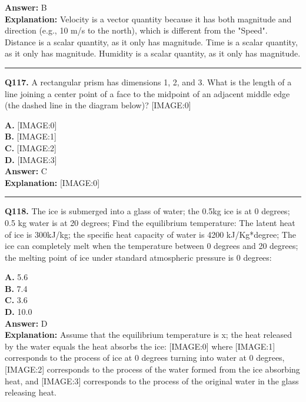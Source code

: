 \documentclass[12pt]{article}
\begin{document}
\textbf{Answer:} B \\
\textbf{Explanation:} Velocity is a vector quantity because it has both magnitude and direction (e.g., 10 m/s to the north), which is different from the "Speed".
Distance is a scalar quantity, as it only has magnitude.
Time is a scalar quantity, as it only has magnitude.
Humidity is a scalar quantity, as it only has magnitude.

\hrule
\vspace{1em}


\noindent
\textbf{Q117.} A rectangular prism has dimensions 1, 2, and 3. What is the length of a line joining a
center point of a face
to the midpoint of
an adjacent
middle edge (the dashed line in the diagram below)?
[IMAGE:0]



\textbf{A.} [IMAGE:0] \\
\textbf{B.} [IMAGE:1] \\
\textbf{C.} [IMAGE:2] \\
\textbf{D.} [IMAGE:3] \\

\textbf{Answer:} C \\
\textbf{Explanation:} [IMAGE:0]

\hrule
\vspace{1em}


\noindent
\textbf{Q118.} The ice is submerged into a glass of water; the 0.5kg ice is at 0 degrees; 0.5 kg water is at 20 degrees; Find the equilibrium temperature: The latent heat of ice is 300kJ/kg; the specific heat capacity of water is 4200 kJ/Kg*degree; The ice can completely melt when the temperature between 0 degrees and 20 degrees; the melting point of ice under standard atmospheric pressure is 0 degrees:



\textbf{A.} 5.6 \\
\textbf{B.} 7.4 \\
\textbf{C.} 3.6 \\
\textbf{D.} 10.0 \\

\textbf{Answer:} D \\
\textbf{Explanation:} Assume that the equilibrium temperature is x; the heat released by the water equals the heat absorbs the ice:
[IMAGE:0]
where
[IMAGE:1]
corresponds to the process of ice at 0 degrees turning into water at 0 degrees,
[IMAGE:2]
corresponds to the process of the water formed from the ice absorbing heat, and
[IMAGE:3]
corresponds to the process of the original water in the glass releasing heat.
\end{document}
